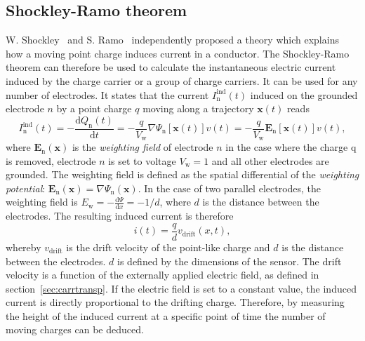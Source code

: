 \subsection{Shockley-Ramo theorem}
W. Shockley~\cite{SHOCKLEY:00000} and S. Ramo~\cite{RAMO:00000} independently proposed a theory which explains how a moving point charge induces current in a conductor. The Shockley-Ramo theorem can therefore be used to calculate the instantaneous electric current induced by the charge carrier or a group of charge carriers. It can be used for any number of electrodes. It states that the current $I_\mathrm{n}^{\mathrm{ind}}(t)$ induced on the grounded electrode $n$ by a point charge $q$ moving along a trajectory $\textbf{x}(t)$ reads
\begin{equation}
\label{eq:ramo}
I_\mathrm{n}^{\mathrm{ind}}(t) = -\frac{\mathrm{d}Q_\mathrm{n}(t)}{\mathrm{d}t} =  -\frac{q}{V_\mathrm{w}}\nabla\Psi_\mathrm{n}[\textbf{x}(t)]v(t)  =  -\frac{q}{V_\mathrm{w}}\textbf{E}_\mathrm{n}[\textbf{x}(t)]v(t),
\end{equation}
where $\textbf{E}_\mathrm{n}(\textbf{x})$ is the \emph{weighting field} of electrode $n$ in the case where the charge q is removed, electrode $n$ is  set to voltage $V_\mathrm{w}=1$ and all other electrodes are grounded.  The weighting field is defined as the spatial differential of the \emph{weighting potential}: $\textbf{E}_\mathrm{n}(\textbf{x})=\nabla \Psi_\mathrm{n}(\textbf{x})$. In the case of two parallel electrodes, the weighting field is $E_\mathrm{w} = -\frac{\mathrm{d}\Psi}{\mathrm{d}x} = -1/d$, where $d$ is the distance between the electrodes. The resulting induced current is therefore
\begin{equation}
\label{eq:ramoparallel}
i(t) = \frac{q}{d}v_\mathrm{drift}(x,t),
\end{equation} 
whereby $v_{\mathrm{drift}}$ is the drift velocity of the point-like charge and $d$ is the distance between the electrodes. $d$ is defined by the dimensions of the sensor. The drift velocity is a function of the externally applied electric field, as defined in section~\ref{sec:carrtransp}. If the electric field is set to a constant value, the induced current is directly proportional to the drifting charge. Therefore, by measuring the height of the induced current at a specific point of time the number of moving charges can be deduced.






